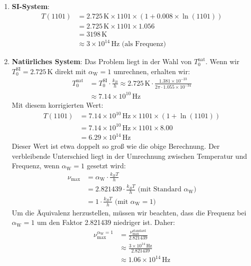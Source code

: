 \documentclass[12pt,a4paper]{article}
\newcommand{\alphaW}{\alpha_{\text{W}}}
\begin{document}
	\begin{enumerate}
		\item \textbf{SI-System}:
		\begin{align}
			T(1101) &= 2.725 \, \text{K} \times 1101 \times (1 + 0.008 \times \ln(1101)) \\
			&= 2.725 \, \text{K} \times 1101 \times 1.056 \\
			&= 3198 \, \text{K} \\
			&\approx 3 \times 10^{14} \, \text{Hz} \text{ (als Frequenz)}
		\end{align}
		\item \textbf{Natürliches System}:
		Das Problem liegt in der Wahl von \(T_0^{\text{nat}}\). Wenn wir \(T_0^{\text{SI}} = 2.725 \, \text{K}\) direkt mit \(\alphaW = 1\) umrechnen, erhalten wir:
		\begin{align}
			T_0^{\text{nat}} &= T_0^{\text{SI}} \cdot \frac{k_B}{h} \approx 2.725 \, \text{K} \cdot \frac{1.381 \times 10^{-23}}{2\pi \cdot 1.055 \times 10^{-34}} \\
			&\approx 7.14 \times 10^{10} \, \text{Hz}
		\end{align}
		Mit diesem korrigierten Wert:
		\begin{align}
			T(1101) &= 7.14 \times 10^{10} \, \text{Hz} \times 1101 \times (1 + \ln(1101)) \\
			&= 7.14 \times 10^{10} \, \text{Hz} \times 1101 \times 8.00 \\
			&= 6.29 \times 10^{14} \, \text{Hz}
		\end{align}
		Dieser Wert ist etwa doppelt so groß wie die obige Berechnung. Der verbleibende Unterschied liegt in der Umrechnung zwischen Temperatur und Frequenz, wenn \(\alphaW = 1\) gesetzt wird:
		\begin{align}
			\nu_{\text{max}} &= \alphaW \cdot \frac{k_B T}{h} \\
			&= 2.821439 \cdot \frac{k_B T}{h} \text{ (mit Standard \(\alphaW\))} \\
			&= 1 \cdot \frac{k_B T}{h} \text{ (mit \(\alphaW = 1\))}
		\end{align}
		Um die Äquivalenz herzustellen, müssen wir beachten, dass die Frequenz bei \(\alphaW = 1\) um den Faktor 2.821439 niedriger ist. Daher:
		\begin{align}
			\nu_{\text{max}}^{\alphaW = 1} &= \frac{\nu_{\text{max}}^{\text{standard}}}{2.821439} \\
			&\approx \frac{3 \times 10^{14} \, \text{Hz}}{2.821439} \\
			&\approx 1.06 \times 10^{14} \, \text{Hz}

\end{align}
\end{enumerate}
\end{document}
